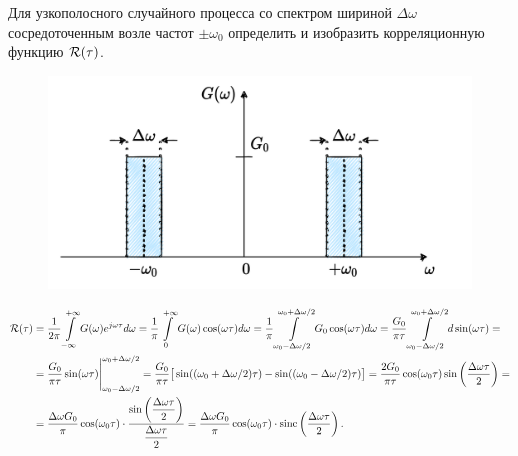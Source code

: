 \protect\thispagestyle{fancy}
\section{}
Для узкополосного случайного процесса со спектром шириной $\Delta \omega$ сосредоточенным возле частот $\pm \omega_0$ определить и изобразить корреляционную функцию $\mathcal{R}(\tau)$.

\begin{figure}[!h]
	\centering
	\includegraphics[width=0.65\columnwidth]{pics/spring/5/1-0.png}
	\label{fig:5-1-0}
\end{figure}


\begin{align*}
\mathcal{R}(\tau) &= \dfrac{1}{2\pi}\int \limits_{-\infty}^{+\infty} G(\omega)e^{j\omega \tau}d\omega =
\dfrac{1}{\pi}\int \limits_{0}^{+\infty} G(\omega)\cos(\omega \tau)d\omega =
\dfrac{1}{\pi}\int \limits_{\omega_0 - \Delta \omega/2}^{\omega_0 + \Delta \omega/2} G_0\cos(\omega \tau)d\omega =
\dfrac{G_0}{\pi\tau}\int \limits_{\omega_0 - \Delta \omega/2}^{\omega_0 + \Delta \omega/2}d\sin(\omega \tau) = \\ &=
\dfrac{G_0}{\pi\tau} \sin(\omega \tau) \Bigg|_{\omega_0 - \Delta \omega/2}^{\omega_0 + \Delta \omega/2}=
\dfrac{G_0}{\pi\tau} \big[ \sin((\omega_0 + \Delta \omega/2)\tau) - \sin((\omega_0 - \Delta \omega/2)\tau)\big] = 
\dfrac{2G_0}{\pi\tau} \cos (\omega_0 \tau) \sin\left(\dfrac{\Delta \omega \tau}{2}\right) =\\&=
\dfrac{\Delta \omega G_0}{\pi} \cos (\omega_0 \tau) \cdot \dfrac{\sin\left(\dfrac{\Delta \omega \tau}{2}\right)}{\dfrac{\Delta \omega\tau}{2}} =
\dfrac{\Delta \omega G_0}{\pi} \cos (\omega_0 \tau)\cdot \text{sinc}\left(\dfrac{\Delta \omega \tau}{2}\right).
\end{align*}



